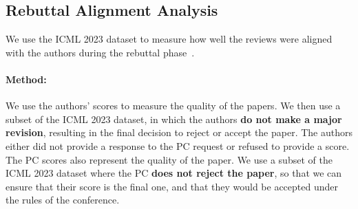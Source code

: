 \documentclass{article} %
\begin{document}
\subsection{Rebuttal Alignment Analysis}
We use the \textsc{ICML 2023} dataset to measure how well the reviews were aligned with the authors during the rebuttal phase~\citep{DBLP:journals/corr/abs-1903-11367}. 

\paragraph{Method:}
We use the authors' scores to measure the quality of the papers. We then use a subset of the \textsc{ICML 2023} dataset, in which the authors \textbf{do not make a major revision}, resulting in the final decision to reject or accept the paper. The authors either did not provide a response to the PC request or refused to provide a score. The PC scores also represent the quality of the paper. We use a subset of the \textsc{ICML 2023} dataset where the PC \textbf{does not reject the paper}, so that we can ensure that their score is the final one, and that they would be accepted under the rules of the conference.
\end{document}

